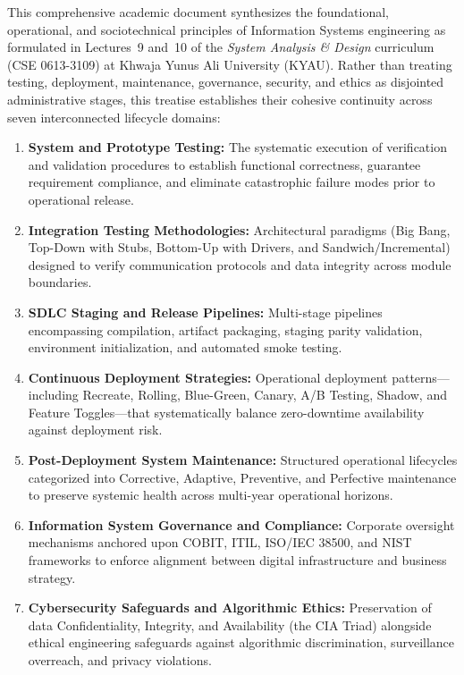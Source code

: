 \documentclass[11pt,a4paper]{article}
\begin{document}
This comprehensive academic document synthesizes the foundational, operational, and sociotechnical principles of Information Systems engineering as formulated in Lectures~9 and~10 of the \textit{System Analysis \& Design} curriculum (CSE 0613-3109) at Khwaja Yunus Ali University (KYAU). Rather than treating testing, deployment, maintenance, governance, security, and ethics as disjointed administrative stages, this treatise establishes their cohesive continuity across seven interconnected lifecycle domains:

\begin{enumerate}
    \item \textbf{System and Prototype Testing:} The systematic execution of verification and validation procedures to establish functional correctness, guarantee requirement compliance, and eliminate catastrophic failure modes prior to operational release.
    \item \textbf{Integration Testing Methodologies:} Architectural paradigms (Big Bang, Top-Down with Stubs, Bottom-Up with Drivers, and Sandwich/Incremental) designed to verify communication protocols and data integrity across module boundaries.
    \item \textbf{SDLC Staging and Release Pipelines:} Multi-stage pipelines encompassing compilation, artifact packaging, staging parity validation, environment initialization, and automated smoke testing.
    \item \textbf{Continuous Deployment Strategies:} Operational deployment patterns---including Recreate, Rolling, Blue-Green, Canary, A/B Testing, Shadow, and Feature Toggles---that systematically balance zero-downtime availability against deployment risk.
    \item \textbf{Post-Deployment System Maintenance:} Structured operational lifecycles categorized into Corrective, Adaptive, Preventive, and Perfective maintenance to preserve systemic health across multi-year operational horizons.
    \item \textbf{Information System Governance and Compliance:} Corporate oversight mechanisms anchored upon COBIT, ITIL, ISO/IEC 38500, and NIST frameworks to enforce alignment between digital infrastructure and business strategy.
    \item \textbf{Cybersecurity Safeguards and Algorithmic Ethics:} Preservation of data Confidentiality, Integrity, and Availability (the CIA Triad) alongside ethical engineering safeguards against algorithmic discrimination, surveillance overreach, and privacy violations.
\end{enumerate}
\end{document}
